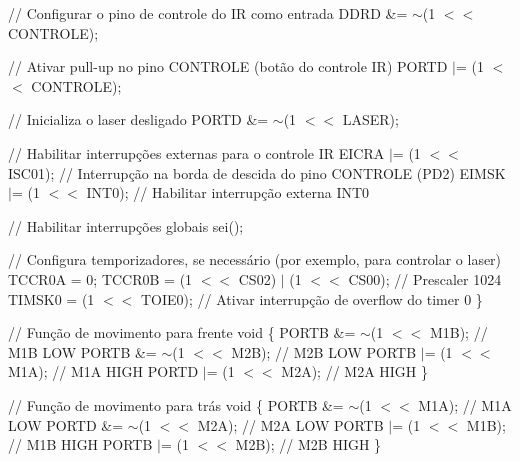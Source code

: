 // Configurar o pino de controle do IR como entrada DDRD \&= \texorpdfstring{$\sim$}{\string~}(1 \texorpdfstring{$<$}{<}\texorpdfstring{$<$}{<} CONTROLE);

// Ativar pull-\/up no pino CONTROLE (botão do controle IR) PORTD \texorpdfstring{$\vert$}{|}= (1 \texorpdfstring{$<$}{<}\texorpdfstring{$<$}{<} CONTROLE);

// Inicializa o laser desligado PORTD \&= \texorpdfstring{$\sim$}{\string~}(1 \texorpdfstring{$<$}{<}\texorpdfstring{$<$}{<} LASER);

// Habilitar interrupções externas para o controle IR EICRA \texorpdfstring{$\vert$}{|}= (1 \texorpdfstring{$<$}{<}\texorpdfstring{$<$}{<} ISC01); // Interrupção na borda de descida do pino CONTROLE (PD2) EIMSK \texorpdfstring{$\vert$}{|}= (1 \texorpdfstring{$<$}{<}\texorpdfstring{$<$}{<} INT0); // Habilitar interrupção externa INT0

// Habilitar interrupções globais sei();

// Configura temporizadores, se necessário (por exemplo, para controlar o laser) TCCR0A = 0; TCCR0B = (1 \texorpdfstring{$<$}{<}\texorpdfstring{$<$}{<} CS02) \texorpdfstring{$\vert$}{|} (1 \texorpdfstring{$<$}{<}\texorpdfstring{$<$}{<} CS00); // Prescaler 1024 TIMSK0 = (1 \texorpdfstring{$<$}{<}\texorpdfstring{$<$}{<} TOIE0); // Ativar interrupção de overflow do timer 0 \}

// Função de movimento para frente void  \{ PORTB \&= \texorpdfstring{$\sim$}{\string~}(1 \texorpdfstring{$<$}{<}\texorpdfstring{$<$}{<} M1B); // M1B LOW PORTB \&= \texorpdfstring{$\sim$}{\string~}(1 \texorpdfstring{$<$}{<}\texorpdfstring{$<$}{<} M2B); // M2B LOW PORTB \texorpdfstring{$\vert$}{|}= (1 \texorpdfstring{$<$}{<}\texorpdfstring{$<$}{<} M1A); // M1A HIGH PORTD \texorpdfstring{$\vert$}{|}= (1 \texorpdfstring{$<$}{<}\texorpdfstring{$<$}{<} M2A); // M2A HIGH \}

// Função de movimento para trás void  \{ PORTB \&= \texorpdfstring{$\sim$}{\string~}(1 \texorpdfstring{$<$}{<}\texorpdfstring{$<$}{<} M1A); // M1A LOW PORTD \&= \texorpdfstring{$\sim$}{\string~}(1 \texorpdfstring{$<$}{<}\texorpdfstring{$<$}{<} M2A); // M2A LOW PORTB \texorpdfstring{$\vert$}{|}= (1 \texorpdfstring{$<$}{<}\texorpdfstring{$<$}{<} M1B); // M1B HIGH PORTB \texorpdfstring{$\vert$}{|}= (1 \texorpdfstring{$<$}{<}\texorpdfstring{$<$}{<} M2B); // M2B HIGH \}

